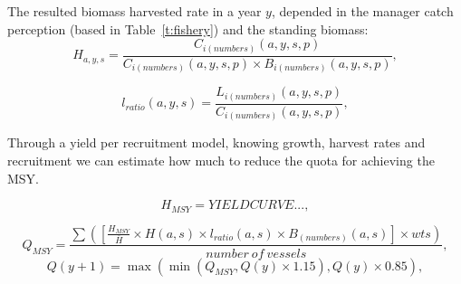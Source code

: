 \documentclass[12pt,oneline,a4paper,numbib]{ouparticle}
\numberwithin{equation}{subsection} %
\begin{document}
The resulted biomass harvested rate in a year $y$, depended in the manager catch perception (based in Table~\ref{t:fishery}) and the standing biomass:
\begin{equation}
 H_{a, y, s} =\frac
                {C_{i (numbers)}(a, y, s, p)}
                {C_{i (numbers)}(a, y, s, p) \times B_{i (numbers)}(a, y, s, p)},
\end{equation}


\begin{equation}
 l_{ratio} (a, y, s) = \frac
                {L_{i (numbers)}(a, y, s, p)}
                {C_{i (numbers)}(a, y, s, p)},
\end{equation}

Through a yield per recruitment model, knowing growth, harvest rates and recruitment we can estimate how much to reduce the quota for achieving the MSY. 

\begin{equation}
 H_{MSY} = YIELD CURVE..., 
\end{equation}

\begin{equation}
 Q_{MSY} = \frac
                {\sum( [\frac{H_{MSY}}{\bar{H}} \times H (a, s) \times l_{ratio} (a, s) \times B_{(numbers)}(a, s)] \times wts) }
                {number\  of\  vessels}, 
\end{equation}
\begin{equation}
 Q (y+1) = \max( \min(Q_{MSY}, Q(y) \times 1.15), Q(y) \times 0.85), 
\end{equation}




        
        
\end{document}

